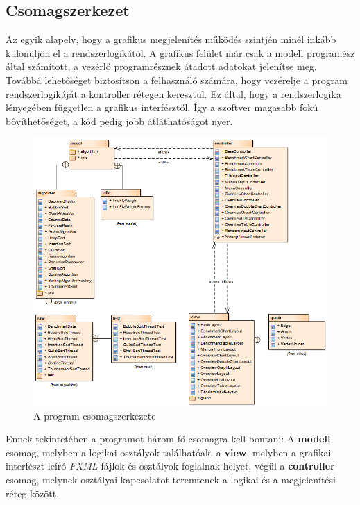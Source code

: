 \documentclass{elteikthesis}
\begin{document}
\subsection{Csomagszerkezet}
Az egyik alapelv, hogy a grafikus megjelenítés működés szintjén minél inkább különüljön el a rendszerlogikától. A grafikus felület már csak a modell programész által számított, a vezérlő programrésznek átadott adatokat jelenítse meg. Továbbá lehetőséget biztosítson a felhasználó számára, hogy vezérelje a program rendszerlogikáját a kontroller rétegen keresztül. Ez által, hogy a rendszerlogika lényegében független a grafikus interfésztől. Így a szoftver magasabb fokú bővíthetőséget, a kód pedig jobb átláthatóságot nyer.\par
 \begin{figure}[H]
 	\centering
 	\includegraphics[width=\textwidth]{pics/packagediagram.png}
 	\caption{A program csomagszerkezete}
 \end{figure}\par
Ennek tekintetében a programot három fő csomagra kell bontani: A \textbf{modell} csomag, melyben a logikai osztályok találhatóak, a \textbf{view}, melyben a grafikai interfészt leíró \emph{FXML} fájlok és osztályok foglalnak helyet, végül a \textbf{controller} csomag, melynek osztályai kapcsolatot teremtenek a logikai és a megjelenítési réteg között.
\end{document}
